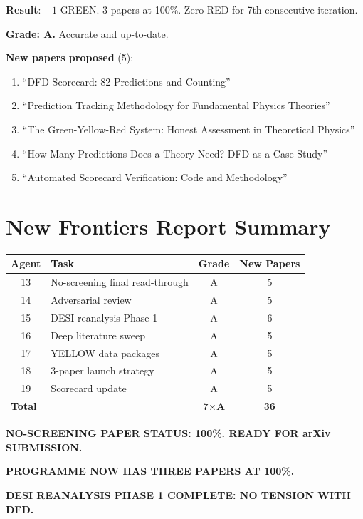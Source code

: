 \documentclass[11pt,a4paper]{article}
\begin{document}
\begin{tcolorbox}[colback=green!5!white, colframe=green!60!black, title={Agent 19: Scorecard 82/4/0}]
\textbf{Result}: $+1$ GREEN. 3 papers at 100\%. Zero RED for 7th consecutive iteration.

\textbf{Grade: A.} Accurate and up-to-date.

\textbf{New papers proposed} (5):
\begin{enumerate}
\item ``DFD Scorecard: 82 Predictions and Counting''
\item ``Prediction Tracking Methodology for Fundamental Physics Theories''
\item ``The Green-Yellow-Red System: Honest Assessment in Theoretical Physics''
\item ``How Many Predictions Does a Theory Need? DFD as a Case Study''
\item ``Automated Scorecard Verification: Code and Methodology''
\end{enumerate}
\end{tcolorbox}


\section*{New Frontiers Report Summary}

\begin{center}
\begin{tabular}{clcc}
\toprule
\textbf{Agent} & \textbf{Task} & \textbf{Grade} & \textbf{New Papers} \\
\midrule
13 & No-screening final read-through & A & 5 \\
14 & Adversarial review & A & 5 \\
15 & DESI reanalysis Phase 1 & A & 6 \\
16 & Deep literature sweep & A & 5 \\
17 & YELLOW data packages & A & 5 \\
18 & 3-paper launch strategy & A & 5 \\
19 & Scorecard update & A & 5 \\
\midrule
\multicolumn{2}{l}{\textbf{Total}} & \textbf{7$\times$A} & \textbf{36} \\
\bottomrule
\end{tabular}
\end{center}

\textbf{NO-SCREENING PAPER STATUS: 100\%. READY FOR arXiv SUBMISSION.}

\textbf{PROGRAMME NOW HAS THREE PAPERS AT 100\%.}

\textbf{DESI REANALYSIS PHASE 1 COMPLETE: NO TENSION WITH DFD.}
\end{document}
